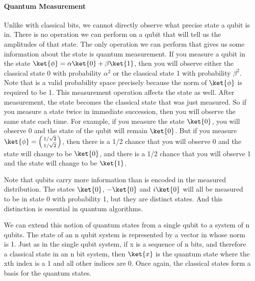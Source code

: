\paragraph{Quantum Measurement}
Unlike with classical bits, we cannot directly observe what precise state a qubit is in.
There is no operation we can perform on a qubit that will tell us the amplitudes of that state.
The only operation we can perform that gives us some information about the state is quantum measurement.
If you measure a qubit in the state $\ket{\phi} = \alpha\ket{0} + \beta\ket{1}$, then you will observe either the classical state 0 with probability $\alpha^2$ or the classical state 1 with probability $\beta^2$. Note that is a valid probability space precisely because the norm of $\ket{\phi}$ is required to be 1.
This measurement operation affects the state as well.
After measurement, the state becomes the classical state that was just measured.
So if you measure a state twice in immediate succession, then you will observe the same state each time.
For example, if you measure the state $\ket{0}$, you will observe 0 and the state of the qubit will remain $\ket{0}$.
But if you measure $\ket{\phi} = \icol{1/\sqrt{2} \\ 1/\sqrt{2}}$, then there is a 1/2 chance that you will observe 0 and the state will change to be $\ket{0}$, and there is a 1/2 chance that you will observe 1 and the state will change to be $\ket{1}$.

Note that qubits carry more information than is encoded in the measured distribution.
The states $\ket{0}$, $-\ket{0}$ and $i\ket{0}$ will all be measured to be in state 0 with probability 1, but they are distinct states.
And this distinction is essential in quantum algorithms.

We can extend this notion of quantum states from a single qubit to a system of n qubits.
The state of an n qubit system is represented by a vector in  whose norm is 1.
Just as in the single qubit system, if x is a sequence of n bits, and therefore a classical state in an n bit system, then $\ket{x}$ is the quantum state where the xth index is a 1 and all other indices are 0. Once again, the classical states form a basis for the quantum states.

